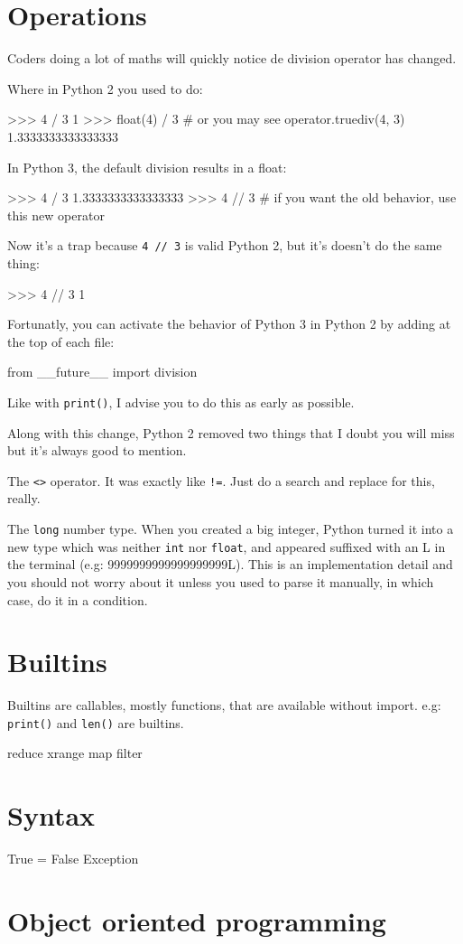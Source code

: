\section{Operations}

Coders doing a lot of maths will quickly notice de division operator has changed.

Where in Python 2 you used to do:

\begin{py}
>>> 4 / 3
1
>>> float(4) / 3  # or you may see operator.truediv(4, 3)
1.3333333333333333
\end{py}

In Python 3, the default division results in a float:

\begin{py}
>>> 4 / 3
1.3333333333333333
>>> 4 // 3  # if you want the old behavior, use this new operator
\end{py}

Now it's a trap because \lstinline{4 // 3} is valid Python 2, but it's doesn't do the same thing:

\begin{py}
>>> 4 // 3
1
\end{py}

Fortunatly, you can activate the behavior of Python 3 in Python 2 by adding at the top of each file:

\begin{py}
from __future__ import division
\end{py}

Like with \lstinline{print()}, I advise you to do this as early as possible.

Along with this change, Python 2 removed two things that I doubt you will miss but it's always good to mention.

\begin{list}
    \item The \lstinline{<>} operator. It was exactly like \lstinline{!=}. Just do a search and replace for this, really.
    \item The \lstinline{long} number type. When you created a big integer, Python turned it into a new type which was neither \lstinline{int} nor \lstinline{float}, and appeared suffixed with an L in the terminal (e.g: 9999999999999999999L). This is an implementation detail and you should not worry about it unless you used to parse it manually, in which case, do it in a condition.
\end{list}


\section{Builtins}

Builtins are callables, mostly functions, that are available without import. e.g: \lstinline{print()} and \lstinline{len()} are builtins.

reduce
xrange
map
filter

\section{Syntax}

True = False
Exception

\section{Object oriented programming}

